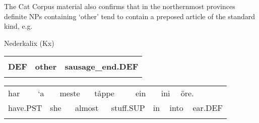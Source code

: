 \begin{styleBodyTextFirst}
The Cat Corpus material also confirms that in the northernmost provinces definite NPs containing ‘other’ tend to contain a preposed article of the standard kind, e.g. 

\end{styleBodyTextFirst}

\begin{listWWNumileveli}
\item {}

\end{listWWNumileveli}

\begin{listWWNumlxivleveli}
\item {}

\begin{styleExLtrTbl}
Nederkalix (Kx)

\end{styleExLtrTbl}

\end{listWWNumlxivleveli}

\begin{tabular}{lll}
\lsptoprule
\multicolumn{3}{l}{{\bfseries Den}

}\\
{\bfseries DEF} & {\bfseries other} & {\bfseries sausage\_end.DEF}\\
\lspbottomrule
\end{tabular}

\begin{tabular}{llllllllllllll}
\lsptoprule
har & \multicolumn{2}{l}{‘a

} & \multicolumn{2}{l}{meste

} & \multicolumn{2}{l}{tåppe

} & \multicolumn{2}{l}{ein

} & \multicolumn{2}{l}{ini

} & \multicolumn{2}{l}{öre.

} & \\
\multicolumn{2}{l}{have.PST

} & \multicolumn{2}{l}{she

} & \multicolumn{2}{l}{almost

} & \multicolumn{2}{l}{stuff.SUP

} & \multicolumn{2}{l}{in

} & \multicolumn{2}{l}{into

} & \multicolumn{2}{l}{ear.DEF

}\\
\lspbottomrule
\end{tabular}

